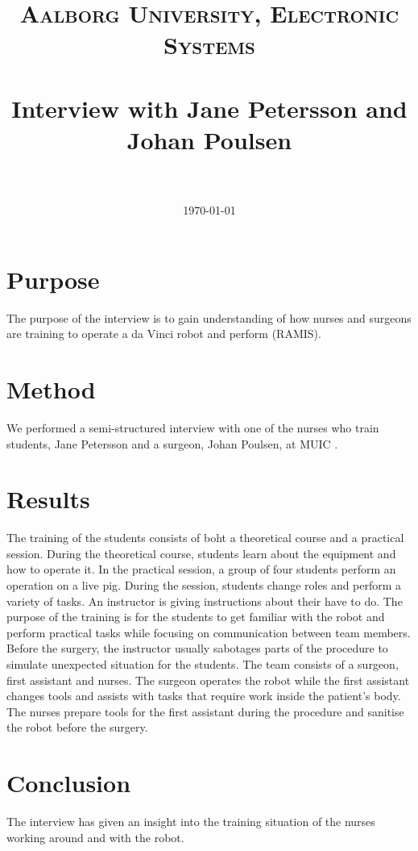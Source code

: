 \documentclass[paper=a4, fontsize=11pt]{scrartcl} %
\title{	
\normalfont \normalsize 
\textsc{Aalborg University, Electronic Systems} \\ [25pt] %
\horrule{0.5pt} \\[0.4cm] %
\huge Interview with Jane Petersson and Johan Poulsen \\ %
\horrule{2pt} \\[0.5cm] %
}
\date{\normalsize\today} %
\numberwithin{equation}{section} %
\numberwithin{figure}{section} %
\numberwithin{table}{section} %
\begin{document}
\maketitle %


\section{Purpose}
The purpose of the interview is to gain understanding of how nurses and surgeons are training to operate a da Vinci robot and perform (RAMIS). 

\section{Method}
We performed a semi-structured interview with one of the nurses who train students, Jane Petersson and a surgeon, Johan Poulsen, at MUIC . 
\section{Results}
The training of the students consists of boht a theoretical course and a practical session. During the theoretical course, students learn about the equipment and how to operate it. In the practical session, a group of four students perform an operation on a live pig. During the session, students change roles and perform a variety of tasks. An instructor is giving instructions about their  have to do. The purpose of the training is for the students to get familiar with the robot and perform practical tasks while focusing on communication between team members. Before the surgery, the instructor usually sabotages parts of the procedure to simulate unexpected situation for the students.
The team consists of a surgeon, first assistant and nurses. The surgeon operates the robot while the first assistant changes tools and assists with tasks that require work inside the patient's body. The nurses prepare tools for the first assistant during the procedure and sanitise the robot before the surgery.
 

\section{Conclusion}
The interview has given an insight into the training situation of the nurses working around and with the robot.
\end{document}
